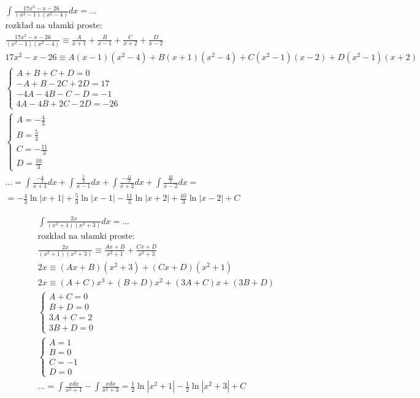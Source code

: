 
\begin{gather*}
  \int \frac{17x^2-x-26}{(x^2-1)(x^2-4)}dx = \ldots \\
  \text{rozkład na ułamki proste:} \\
  \frac{17x^2-x-26}{(x^2-1)(x^2-4)} \equiv \frac{A}{x+1}+\frac{B}{x-1}+\frac{C}{x+2}+\frac{D}{x-2} \\
  17x^2-x-26 \equiv A(x-1)(x^2-4)+B(x+1)(x^2-4)+C(x^2-1)(x-2)+D(x^2-1)(x+2) \\
  \begin{cases} A+B+C+D=0 \\ -A+B-2C+2D=17 \\ -4A-4B-C-D=-1 \\ 4A-4B+2C-2D=-26 \end{cases} \\
  \begin{cases} A=-\frac{4}{3} \\ B=\frac{5}{3} \\ C=-\frac{11}{3} \\ D=\frac{10}{3} \end{cases} \\
  \ldots = \int \frac{-\frac{4}{3}}{x+1}dx + \int \frac{\frac{5}{3}}{x-1}dx + \int \frac{-\frac{11}{3}}{x+2}dx+\int \frac{\frac{10}{3}}{x-2}dx = \\
  = -\frac{4}{3}\ln|x+1| +\frac{5}{3}\ln|x-1| -\frac{11}{3}\ln|x+2|+\frac{10}{3}\ln|x-2|+C
\end{gather*}



\begin{gather*}
  \int \frac{2x}{(x^2+1)(x^2+3)}dx = \ldots \\
  \text{rozkład na ułamki proste:} \\
  \frac{2x}{(x^2+1)(x^2+3)} \equiv \frac{Ax+B}{x^2+1}+\frac{Cx+D}{x^2+3} \\
  2x \equiv (Ax+B)(x^2+3)+(Cx+D)(x^2+1) \\
  2x \equiv (A+C)x^3+(B+D)x^2+(3A+C)x+(3B+D) \\
  \begin{cases} A+C=0 \\ B+D=0 \\ 3A+C=2 \\ 3B+D=0 \end{cases} \\
  \begin{cases} A=1 \\ B=0 \\ C=-1 \\ D=0 \end{cases} \\
  \ldots = \int \frac{xdx}{x^2+1} - \int \frac{xdx}{x^2+3} = \frac{1}{2}\ln|x^2+1|-\frac{1}{2}\ln|x^2+3|+C
\end{gather*}


